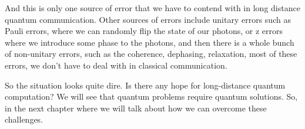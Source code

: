 And this is only one source of error that we have to contend with in long distance quantum communication. Other sources of errors include unitary errors such as Pauli errors, where we can randomly flip the state of our photons, or z errors where we introduce some phase to the photons, and then there is a whole bunch of non-unitary errors, such as the coherence, dephasing, relaxation, most of these errors, we don't have to deal with in classical communication.

So the situation looks quite dire. Is there any hope for long-distance quantum computation? We will see that quantum problems require quantum solutions. So,  in the next chapter where we will talk about how we can overcome these challenges.



\newpage
\begin{exercises}


\end{exercises}

